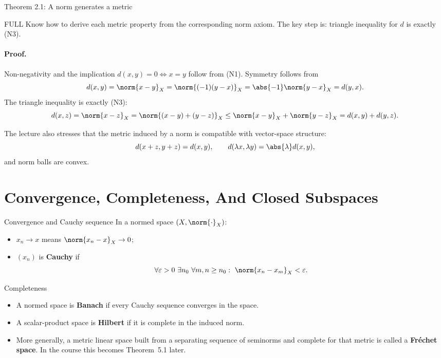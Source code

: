 \documentclass[header={Lecture 1 Exam Study Notes}]{study-note}
\begin{document}
\begin{thmbox}{Theorem 2.1: A norm generates a metric}
\thmNormInducesMetric
\end{thmbox}

\begin{prooflevelbox}{FULL}
Know how to derive each metric property from the corresponding norm axiom. The key step is: triangle inequality for $d$ is exactly (N3).
\end{prooflevelbox}

\paragraph{Proof.}
Non-negativity and the implication $d(x,y)=0 \iff x=y$ follow from (N1). Symmetry follows from
\[
d(x,y)=\norm{x-y}_X=\norm{(-1)(y-x)}_X=\abs{-1}\norm{y-x}_X=d(y,x).
\]
The triangle inequality is exactly (N3):
\[
d(x,z)=\norm{x-z}_X=\norm{(x-y)+(y-z)}_X\le \norm{x-y}_X+\norm{y-z}_X=d(x,y)+d(y,z).
\]

\begin{focusbox}
The lecture also stresses that the metric induced by a norm is compatible with vector-space structure:
\[
d(x+z,y+z)=d(x,y),
\qquad
d(\lambda x,\lambda y)=\abs{\lambda}d(x,y),
\]
and norm balls are convex.
\end{focusbox}

\section{Convergence, Completeness, And Closed Subspaces}

\begin{defbox}{Convergence and Cauchy sequence}
In a normed space $(X,\norm{\cdot}_X)$:
\begin{itemize}
\item $x_n\to x$ means $\norm{x_n-x}_X\to 0$;
\item $(x_n)$ is \textbf{Cauchy} if
\[
\forall \varepsilon>0\ \exists n_0\ \forall m,n\ge n_0:\ \norm{x_n-x_m}_X<\varepsilon.
\]
\end{itemize}
\end{defbox}

\begin{defbox}{Completeness}
\begin{itemize}
\item A normed space is \textbf{Banach} if every Cauchy sequence converges in the space.
\item A scalar-product space is \textbf{Hilbert} if it is complete in the induced norm.
\item More generally, a metric linear space built from a separating sequence of seminorms and complete for that metric is called a \textbf{Fr\'echet space}. In the course this becomes Theorem~5.1 later.
\end{itemize}
\end{defbox}
\end{document}
